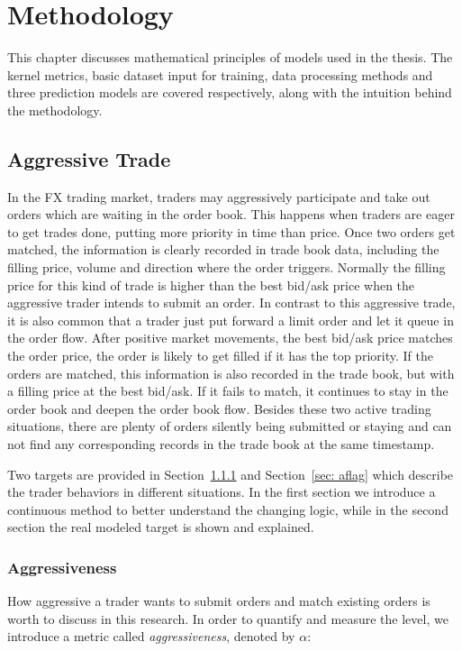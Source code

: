 \chapter{Methodology}\label{chapter:methodology}
This chapter discusses mathematical principles of models used in the thesis. The kernel metrics, basic dataset input for training, data processing methods and three prediction models are covered respectively, along with the intuition behind the methodology.

\section{Aggressive Trade}
In the FX trading market, traders may aggressively participate and take out orders which are waiting in the order book. This happens when traders are eager to get trades done, putting more priority in time than price. Once two orders get matched, the information is clearly recorded in trade book data, including the filling price, volume and direction where the order triggers. Normally the filling price for this kind of trade is higher than the best bid/ask price when the aggressive trader intends to submit an order. In contrast to this aggressive trade, it is also common that a trader just put forward a limit order and let it queue in the order flow. After positive market movements, the best bid/ask price matches the order price, the order is likely to get filled if it has the top priority. If the orders are matched, this information is also recorded in the trade book, but with a filling price at the best bid/ask. If it fails to match, it continues to stay in the order book and deepen the order book flow. Besides these two active trading situations, there are plenty of orders silently being submitted or staying and can not find any corresponding records in the trade book at the same timestamp. 

Two targets are provided in Section~\ref{sec: alpha} and Section~\ref{sec: aflag} which describe the trader behaviors in different situations. In the first section we introduce a continuous method to better understand the changing logic, while in the second section the real modeled target is shown and explained.

\subsection{Aggressiveness} \label{sec: alpha}
How aggressive a trader wants to submit orders and match existing orders is worth to discuss in this research. In order to quantify and measure the level, we introduce a metric called \textit{aggressiveness}, denoted by $\alpha$:

